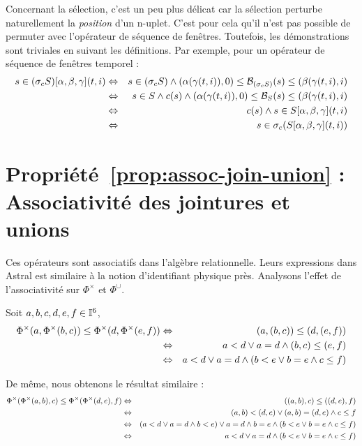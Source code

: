 Concernant la sélection, c'est un peu plus délicat car la sélection perturbe naturellement la \textit{position} d'un n-uplet. C'est pour cela qu'il n'est pas possible de permuter avec l'opérateur de séquence de fenêtres. Toutefois, les démonstrations sont triviales en suivant les définitions. Par exemple, pour un opérateur de séquence de fenêtres temporel :
\begin{eqnarray*}
s\in (\sigma_c S)[\alpha,\beta,\gamma](t,i) & \Leftrightarrow & s\in (\sigma_c S) \wedge (\alpha(\gamma(t,i)),0) \leq \mathcal{B}_{(\sigma_c S)}(s) \leq (\beta(\gamma(t,i),i)\\
& \Leftrightarrow & s\in S \wedge c(s) \wedge (\alpha(\gamma(t,i)),0) \leq \mathcal{B}_S(s) \leq (\beta(\gamma(t,i),i)\\
& \Leftrightarrow & c(s) \wedge s\in S[\alpha,\beta,\gamma](t,i)\\
& \Leftrightarrow & s\in \sigma_c (S[\alpha,\beta,\gamma](t,i))
\end{eqnarray*}
\findemo

\section{Propriété~\ref{prop:assoc-join-union} : Associativité des jointures et unions}
Ces opérateurs sont associatifs dans l'algèbre relationnelle. Leurs expressions dans Astral est similaire à la notion d'identifiant physique près. Analysons l'effet de l'associativité sur $\Phi^\times$ et $\Phi^\cup$.

Soit $a,b,c,d,e,f \in \mathbb{I}^6$, 
\begin{eqnarray*}
\Phi^\times(a,\Phi^\times(b,c)) \leq \Phi^\times(d,\Phi^\times(e,f))& \Leftrightarrow & (a,(b,c)) \leq (d,(e,f)) \\
& \Leftrightarrow &  a < d \vee a=d \wedge (b,c) \leq (e,f) \\
& \Leftrightarrow &  a < d \vee a=d \wedge (b < e \vee b=e \wedge c \leq f)
\end{eqnarray*}

De même, nous obtenons le résultat similaire :
\begin{eqnarray*}
\Phi^\times(\Phi^\times(a,b),c) \leq \Phi^\times(\Phi^\times(d,e),f)& \Leftrightarrow & ((a,b),c) \leq ((d,e),f) \\
& \Leftrightarrow & (a,b) < (d,e) \vee (a,b) = (d,e) \wedge c \leq f \\
& \Leftrightarrow & (a < d \vee a = d \wedge b < e) \vee a = d \wedge b = e \wedge (b < e \vee b=e \wedge c \leq f) \\
& \Leftrightarrow &  a < d \vee a=d \wedge (b < e \vee b=e \wedge c \leq f)
\end{eqnarray*}

